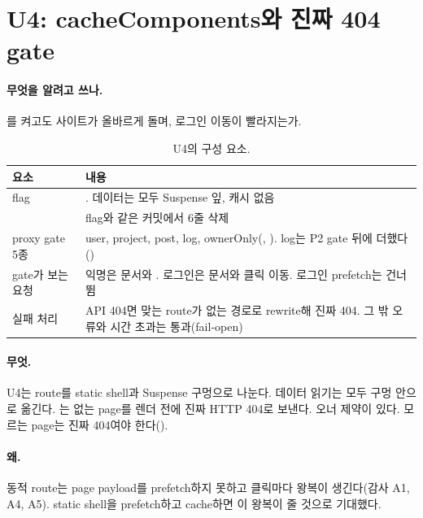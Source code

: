 \section{U4: cacheComponents와 진짜 404 gate}\label{sec:cc3-u4}

\paragraph{무엇을 알려고 쓰나.}
를 켜고도 사이트가 올바르게 돌며, 로그인 이동이 빨라지는가.

\begin{table}[H]
  \caption{U4의 구성 요소.}
  \label{tab:cc3-u4}
  \centering\small
  \begin{tabularx}{\linewidth}{@{}L{3.4cm} Y@{}}
    \toprule
    요소 & 내용 \\
    \midrule
    flag & . 데이터는 모두 Suspense 잎, 캐시 없음 \\
    \midrule
     & flag와 같은 커밋에서 6줄 삭제 \\
    \midrule
    proxy gate 5종 & user, project, post, log, ownerOnly(, ). log는 P2 gate 뒤에 더했다() \\
    \midrule
    gate가 보는 요청 & 익명은 문서와 . 로그인은 문서와 클릭 이동. 로그인 prefetch는 건너뜀 \\
    \midrule
    실패 처리 & API 404면 맞는 route가 없는 경로로 rewrite해 진짜 404. 그 밖 오류와 시간 초과는 통과(fail-open) \\
    \bottomrule
  \end{tabularx}
\end{table}

\paragraph{무엇.}
U4는 route를 static shell과 Suspense 구멍으로 나눈다. 데이터 읽기는 모두 구멍 안으로 옮긴다.
는 없는 page를 렌더 전에 진짜 HTTP 404로 보낸다.
오너 제약이 있다. 모르는 page는 진짜 404여야 한다().

\paragraph{왜.}
동적 route는 page payload를 prefetch하지 못하고 클릭마다 왕복이 생긴다(감사 A1, A4, A5).
static shell을 prefetch하고 cache하면 이 왕복이 줄 것으로 기대했다.

